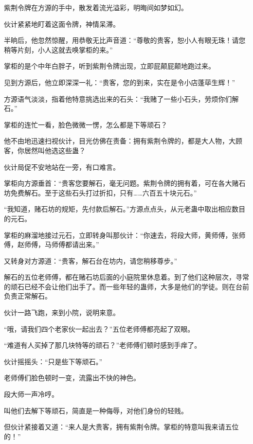 
\begin{this_body}



紫荆令牌在方源的手中，散发着流光溢彩，明晦间如梦如幻。

伙计紧紧地盯着这面令牌，神情呆滞。

半晌后，他忽然惊醒，用恭敬无比声音道：“尊敬的贵客，恕小人有眼无珠！请您稍等片刻，小人这就去唤掌柜的来。”

掌柜的是个中年白胖子，听到紫荆令牌出现，立即屁颠屁颠地跑过来。

见到方源后，他立即深深一礼：“贵客，您的到来，实在是令小店蓬荜生辉！”

方源语气淡淡，指着他特意挑选出来的石头：“我赌了一些小石头，劳烦你们解石。”

掌柜的连忙一看，脸色微微一愣，怎么都是下等顽石？

他不由地迅速扫视伙计，目光仿佛在责备：拥有紫荆令牌的，都是大人物，大顾客，你居然叫他选这些蛊？

伙计局促不安地站在一旁，有口难言。

掌柜向方源垂首：“贵客您要解石，毫无问题。紫荆令牌的拥有着，可在各大赌石坊免费解石。至于这些石头打过折扣，只有……六百五十块元石。”

“我知道，赌石坊的规矩，先付款后解石。”方源点点头，从元老蛊中取出相应数目的元石。

掌柜的麻溜地接过元石，立即转身叫那伙计：“你速去，将段大师，黄师傅，张师傅，赵师傅，马师傅都请出来。”

又转身对方源道：“贵客，解石台在坊内，请您稍移尊步。”

解石的五位老师傅，都在赌石坊后面的小庭院里休息着。到了他们这种层次，寻常的顽石已经不会让他们出手了。而一些年轻的蛊师，大多是他们的学徒。则在台前负责正常解石。

伙计一路飞跑，来到小院，说明来意。

“哦，请我们四个老家伙一起出去？”五位老师傅都亮起了双眼。

“难道有人买掉了那几块特等的顽石？”老师傅们顿时感到手痒了。

伙计摇摇头：“只是些下等顽石。”

老师傅们脸色顿时一变，流露出不快的神色。

段大师一声冷哼。

叫他们去解下等顽石，简直是一种侮辱，对他们身份的轻贱。

但伙计紧接着又道：“来人是大贵客，拥有紫荆令牌。掌柜的特意叫我来请五位的！”


\end{this_body}

